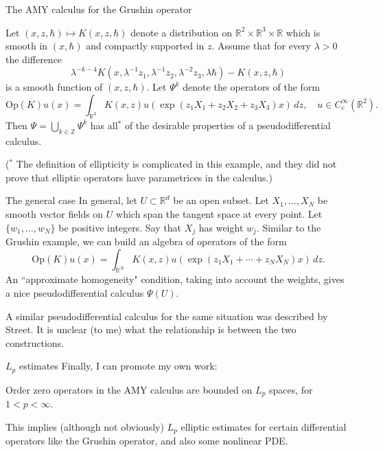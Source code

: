 \documentclass{beamer}
\numberwithin{equation}{section}
\theoremstyle{plain}
\theoremstyle{plain}
\theoremstyle{definition}
\theoremstyle{plain}
\theoremstyle{plain}
\theoremstyle{definition}
\newcommand{\Rl}{\mathbb{R}}
\newcommand{\Itgr}{\mathbb{Z}}
\newcommand{\Op}{\mathrm{Op}}
\begin{document}
\begin{frame}{The AMY calculus for the Grushin operator}
\begin{theorem}
    Let $(x,z,\hbar)\mapsto K(x,z,\hbar)$ denote a distribution on $\Rl^2\times\Rl^3\times \Rl$ which is smooth in $(x,\hbar)$ and compactly supported in $z.$ Assume that for every $\lambda>0$ the difference
    \[
        \lambda^{-k-4}K(x,\lambda^{-1}z_1,\lambda^{-1}z_2,\lambda^{-2}z_3,\lambda\hbar)-K(x,z,\hbar)
    \]
    is a smooth function of $(x,z,\hbar).$ Let $\Psi^k$ denote the operators of the form 
    \[
        \Op(K)u(x) = \int_{\Rl^3} K(x,z)u(\exp(z_1X_1+z_2X_2+z_3X_3)x)\,dz,\quad u\in C^\infty_c(\Rl^2).
    \]
    Then $\Psi = \bigcup_{k\in \Itgr} \Psi^k$ has all$^*$ of the desirable properties of a pseudodifferential calculus.
\end{theorem}
\pause
($^*$ The definition of ellipticity is complicated in this example, and they did not prove that elliptic operators have parametrices in the calculus.)
\end{frame}

\begin{frame}{The general case}
    In general, let $U\subset \Rl^d$ be an open subset. Let $X_1,\ldots,X_N$ be smooth vector fields on $U$ which span the tangent space at every point. Let $\{w_1,\ldots,w_N\}$ be positive integers. Say that $X_j$ has weight $w_j.$ 
    \pause
    Similar to the Grushin example, we can build an algebra of operators of the form
    \[
        \Op(K)u(x) = \int_{\Rl^N} K(x,z)u(\exp(z_1X_1+\cdots+z_NX_N)x)\,dz.
    \]
    An ``approximate homogeneity" condition, taking into account the weights, gives a nice pseudodifferential calculus $\Psi(U).$
    \pause
    
    
    A similar pseudodifferential calculus for the same situation was described by Street. It is unclear (to me) what the relationship is between the two constructions.
\end{frame}

\begin{frame}{$L_p$ estimates}
    Finally, I can promote my own work:
    \begin{theorem}[M. (2024)]
        Order zero operators in the AMY calculus are bounded on $L_p$ spaces, for $1<p<\infty.$
    \end{theorem}
    This implies (although not obviously) $L_p$ elliptic estimates for certain differential operators like the Grushin operator, and also some nonlinear PDE.
\end{frame}
\end{document}
